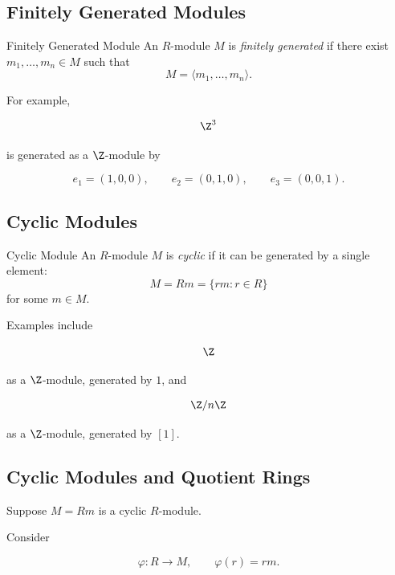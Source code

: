 \subsection{Finitely Generated Modules}
\label{subsec:finitely-generated-modules}

\begin{definitionbox}{Finitely Generated Module}
An \(R\)-module \(M\) is \emph{finitely generated} if there exist
\(m_1,\ldots,m_n\in M\) such that
\[ M=\langle m_1,\ldots,m_n\rangle. \]
\end{definitionbox}

For example,

\[ \Z^3 \]

is generated as a \(\Z\)-module by

\[ e_1=(1,0,0),\qquad e_2=(0,1,0),\qquad e_3=(0,0,1). \]

\subsection{Cyclic Modules}
\label{subsec:cyclic-modules}

\begin{definitionbox}{Cyclic Module}
An \(R\)-module \(M\) is \emph{cyclic} if it can be generated by a single
element:
\[ M=Rm=\{rm:r\in R\} \]
for some \(m\in M\).
\end{definitionbox}

Examples include

\[ \Z \]

as a \(\Z\)-module, generated by \(1\), and

\[ \Z/n\Z \]

as a \(\Z\)-module, generated by \([1]\).

\subsection{Cyclic Modules and Quotient Rings}
\label{subsec:cyclic-modules-quotients}

Suppose \(M=Rm\) is a cyclic \(R\)-module.

Consider

\[ \varphi:R\to M,\qquad\varphi(r)=rm. \]

